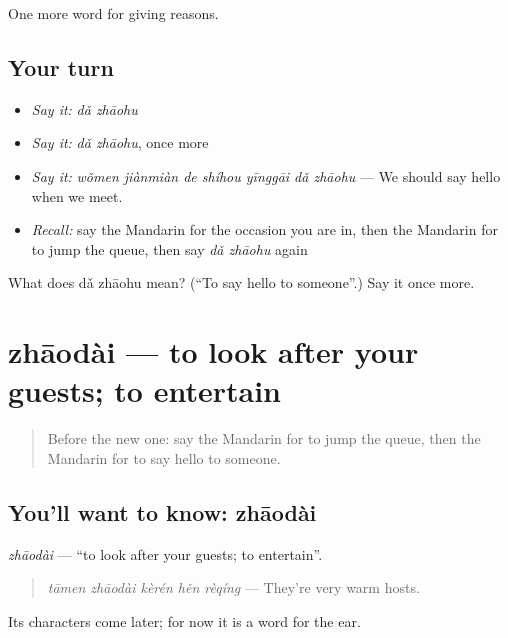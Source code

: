 \begin{grammarlens}[title={What you've built}]
One more word for giving reasons.
\end{grammarlens}

\subsection*{Your turn}
\begin{itemize}
\raggedright
  \item \emph{Say it:} \emph{dǎ zhāohu}
  \item \emph{Say it:} \emph{dǎ zhāohu}, once more
  \item \emph{Say it:} \emph{wǒmen jiànmiàn de shíhou yīnggāi dǎ zhāohu} — We should say hello when we meet.
  \item \emph{Recall:} say the Mandarin for the occasion you are in, then the Mandarin for to jump the queue, then say \emph{dǎ zhāohu} again
\end{itemize}

\begin{tcolorbox}[breakable,colback=teal!4,colframe=teal!35!black,title={Before you move on}]
What does dǎ zhāohu mean? (\textquotedblleft{}To say hello to someone\textquotedblright{}.) Say it once more.
\end{tcolorbox}
\section[zhāodài]{zhāodài — to look after your guests; to entertain}

\label{lesson:ZH-C361-zhaodai}



\begin{quote}
Before the new one: say the Mandarin for to jump the queue, then the Mandarin for to say hello to someone.
\end{quote}

\subsection*{You'll want to know: zhāodài}
\emph{zhāodài} — \textquotedblleft{}to look after your guests; to entertain\textquotedblright{}.

\begin{quote}
\emph{tāmen zhāodài kèrén hěn rèqíng} — They're very warm hosts.
\end{quote}

Its characters come later; for now it is a word for the ear.

